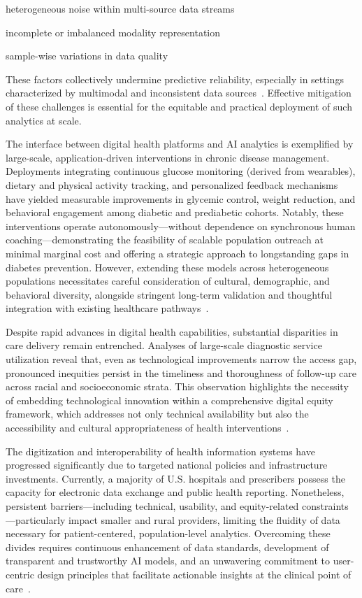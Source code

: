 \documentclass[sigconf]{acmart}
\begin{document}
heterogeneous noise within multi-source data streams

incomplete or imbalanced modality representation

sample-wise variations in data quality

These factors collectively undermine predictive reliability, especially in settings characterized by multimodal and inconsistent data sources~\cite{ref78}. Effective mitigation of these challenges is essential for the equitable and practical deployment of such analytics at scale.

The interface between digital health platforms and AI analytics is exemplified by large-scale, application-driven interventions in chronic disease management. Deployments integrating continuous glucose monitoring (derived from wearables), dietary and physical activity tracking, and personalized feedback mechanisms have yielded measurable improvements in glycemic control, weight reduction, and behavioral engagement among diabetic and prediabetic cohorts. Notably, these interventions operate autonomously—without dependence on synchronous human coaching—demonstrating the feasibility of scalable population outreach at minimal marginal cost and offering a strategic approach to longstanding gaps in diabetes prevention. However, extending these models across heterogeneous populations necessitates careful consideration of cultural, demographic, and behavioral diversity, alongside stringent long-term validation and thoughtful integration with existing healthcare pathways~\cite{ref69}.

Despite rapid advances in digital health capabilities, substantial disparities in care delivery remain entrenched. Analyses of large-scale diagnostic service utilization reveal that, even as technological improvements narrow the access gap, pronounced inequities persist in the timeliness and thoroughness of follow-up care across racial and socioeconomic strata. This observation highlights the necessity of embedding technological innovation within a comprehensive digital equity framework, which addresses not only technical availability but also the accessibility and cultural appropriateness of health interventions~\cite{ref85}.

The digitization and interoperability of health information systems have progressed significantly due to targeted national policies and infrastructure investments. Currently, a majority of U.S. hospitals and prescribers possess the capacity for electronic data exchange and public health reporting. Nonetheless, persistent barriers—including technical, usability, and equity-related constraints—particularly impact smaller and rural providers, limiting the fluidity of data necessary for patient-centered, population-level analytics. Overcoming these divides requires continuous enhancement of data standards, development of transparent and trustworthy AI models, and an unwavering commitment to user-centric design principles that facilitate actionable insights at the clinical point of care~\cite{ref82,ref84}.
\end{document}
